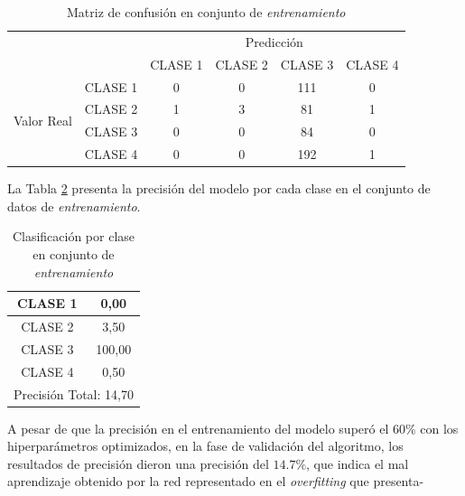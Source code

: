 \begin{table}[htbp]
	\centering
	\resizebox{10cm}{!} {
	\begin{tabular}{|c|l|c|c|c|c|}
		\hline
		\multicolumn{2}{|c|}{\multirow{2}[4]{*}{}} & \multicolumn{4}{c|}{Predicción} \bigstrut\\
		\cline{3-6}    \multicolumn{2}{|c|}{} & CLASE 1 & CLASE 2 & CLASE 3 & CLASE 4 \bigstrut\\
		\hline
		\multirow{4}[8]{*}{\begin{sideways}Valor Real\end{sideways}} & CLASE 1 & 0     & 0     & 111    & 0 \bigstrut\\
		\cline{2-6}          & CLASE 2 & 1     & 3     & 81    & 1 \bigstrut\\
		\cline{2-6}          & CLASE 3 & 0     & 0     & 84    & 0 \bigstrut\\
		\cline{2-6}          & CLASE 4 & 0     & 0     & 192    & 1 \bigstrut\\
		\hline
	\end{tabular}
	}
	\caption{Matriz de confusión en conjunto de \textit{entrenamiento}}
	\label{tab:MC_ALEX_OPT_2}%
\end{table}%

\newpage
La Tabla \ref{tab:Alexoptclases_2} presenta la precisión del modelo por cada clase en el conjunto de datos de \textit{entrenamiento}.

\begin{table}[htbp]
	\centering
	\begin{tabular}{|c|c|}
		\hline
		CLASE 1 & 0,00 \bigstrut\\
		\hline
		CLASE 2 & 3,50 \bigstrut\\
		\hline
		CLASE 3 & 100,00 \bigstrut\\
		\hline
		CLASE 4 & 0,50 \bigstrut\\
		\hline
		\multicolumn{2}{|c|}{Precisión Total: 14,70} \bigstrut\\
		\hline
	\end{tabular}%
	\caption{Clasificación por clase en conjunto de \textit{entrenamiento}
	}
	\label{tab:Alexoptclases_2}%
\end{table}%

A pesar de que la precisión en el entrenamiento del modelo superó el $60\%$ con los hiperparámetros optimizados, en la fase de validación del algoritmo, los resultados de precisión dieron una precisión del $14.7\%$, que indica el mal aprendizaje obtenido por la red representado en el \textit{overfitting} que presenta-

